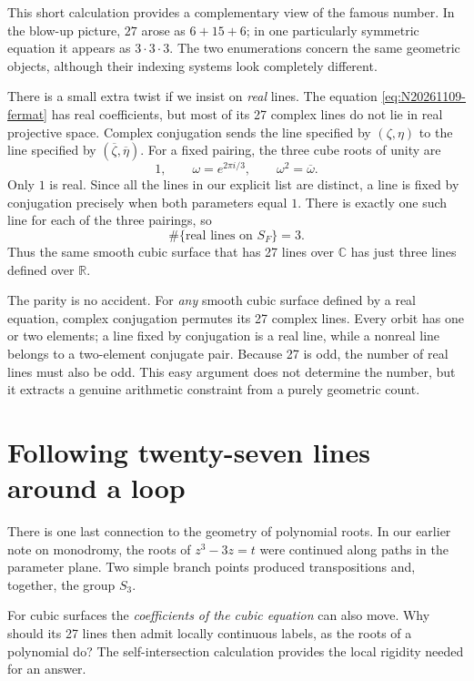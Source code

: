 This short calculation provides a complementary view of the famous number. In the blow-up picture, \(27\) arose as \(6+15+6\); in one particularly symmetric equation it appears as \(3\cdot3\cdot3\). The two enumerations concern the same geometric objects, although their indexing systems look completely different.

There is a small extra twist if we insist on \emph{real} lines. The equation \eqref{eq:N20261109-fermat} has real coefficients, but most of its 27 complex lines do not lie in real projective space. Complex conjugation sends the line specified by \((\zeta,\eta)\) to the line specified by \((\overline\zeta,\overline\eta)\). For a fixed pairing, the three cube roots of unity are
\[
 1,\qquad\omega=e^{2\pi i/3},\qquad
 \omega^2=\overline\omega.
\]
Only \(1\) is real. Since all the lines in our explicit list are distinct, a line is fixed by conjugation precisely when both parameters equal \(1\). There is exactly one such line for each of the three pairings, so
\[
 \boxed{\#\{\text{real lines on }S_F\}=3.}
\]
Thus the same smooth cubic surface that has 27 lines over \(\mathbb C\) has just three lines defined over \(\mathbb R\).

The parity is no accident. For \emph{any} smooth cubic surface defined by a real equation, complex conjugation permutes its 27 complex lines. Every orbit has one or two elements; a line fixed by conjugation is a real line, while a nonreal line belongs to a two-element conjugate pair. Because 27 is odd, the number of real lines must also be odd. This easy argument does not determine the number, but it extracts a genuine arithmetic constraint from a purely geometric count.

\section{Following twenty-seven lines around a loop}

There is one last connection to the geometry of polynomial roots. In our earlier note on monodromy, the roots of \(z^3-3z=t\) were continued along paths in the parameter plane. Two simple branch points produced transpositions and, together, the group \(S_3\).

For cubic surfaces the \emph{coefficients of the cubic equation} can also move. Why should its 27 lines then admit locally continuous labels, as the roots of a polynomial do? The self-intersection calculation provides the local rigidity needed for an answer.

